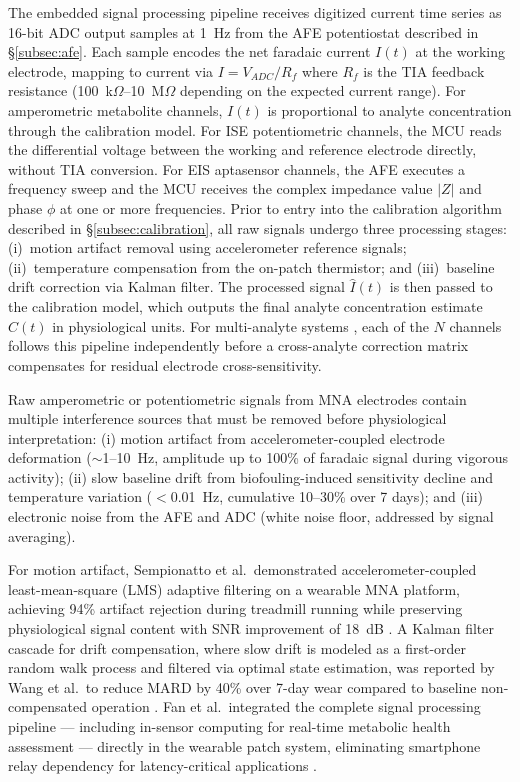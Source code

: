 \documentclass[review,1p]{elsarticle}
\begin{document}
The embedded signal processing pipeline receives digitized current time series as 16-bit ADC output samples at 1~Hz from the AFE potentiostat described in \S\ref{subsec:afe}. Each sample encodes the net faradaic current $I(t)$ at the working electrode, mapping to current via $I = V_{ADC}/R_f$ where $R_f$ is the TIA feedback resistance (100~k$\Omega$--10~M$\Omega$ depending on the expected current range). For amperometric metabolite channels, $I(t)$ is proportional to analyte concentration through the calibration model. For ISE potentiometric channels, the MCU reads the differential voltage between the working and reference electrode directly, without TIA conversion. For EIS aptasensor channels, the AFE executes a frequency sweep and the MCU receives the complex impedance value $|Z|$ and phase $\phi$ at one or more frequencies. Prior to entry into the calibration algorithm described in \S\ref{subsec:calibration}, all raw signals undergo three processing stages: (i)~motion artifact removal using accelerometer reference signals; (ii)~temperature compensation from the on-patch thermistor; and (iii)~baseline drift correction via Kalman filter. The processed signal $\hat{I}(t)$ is then passed to the calibration model, which outputs the final analyte concentration estimate $\hat{C}(t)$ in physiological units. For multi-analyte systems \cite{Li2025Innovation}, each of the $N$ channels follows this pipeline independently before a cross-analyte correction matrix compensates for residual electrode cross-sensitivity.

Raw amperometric or potentiometric signals from MNA electrodes contain multiple interference sources that must be removed before physiological interpretation: (i) motion artifact from accelerometer-coupled electrode deformation ($\sim$1--10~Hz, amplitude up to 100\% of faradaic signal during vigorous activity); (ii) slow baseline drift from biofouling-induced sensitivity decline and temperature variation ($<$0.01~Hz, cumulative 10--30\% over 7 days); and (iii) electronic noise from the AFE and ADC (white noise floor, addressed by signal averaging).

For motion artifact, Sempionatto et al.\ demonstrated accelerometer-coupled least-mean-square (LMS) adaptive filtering on a wearable MNA platform, achieving 94\% artifact rejection during treadmill running while preserving physiological signal content with SNR improvement of 18~dB \cite{Sempionatto2023Motion}. A Kalman filter cascade for drift compensation, where slow drift is modeled as a first-order random walk process and filtered via optimal state estimation, was reported by Wang et al.\ to reduce MARD by 40\% over 7-day wear compared to baseline non-compensated operation \cite{Wang2022Kalman}. Fan et al.\ integrated the complete signal processing pipeline — including in-sensor computing for real-time metabolic health assessment — directly in the wearable patch system, eliminating smartphone relay dependency for latency-critical applications \cite{Fan2026EdgeAI}.
\end{document}
